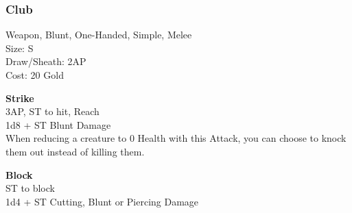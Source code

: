 \subsubsection{Club}\label{weapon:club}
Weapon, Blunt, One-Handed, Simple, Melee\\
Size: S\\
Draw/Sheath: 2AP\\
Cost: 20 Gold

\textbf{Strike}\\
3AP, ST to hit,  Reach\\
1d8 + \texttimes ST Blunt Damage\\
When reducing a creature to 0 Health with this Attack, you can choose to knock them out instead of killing them.

\textbf{Block}\\
ST to block\\
1d4 + \texttimes ST Cutting, Blunt or Piercing Damage

